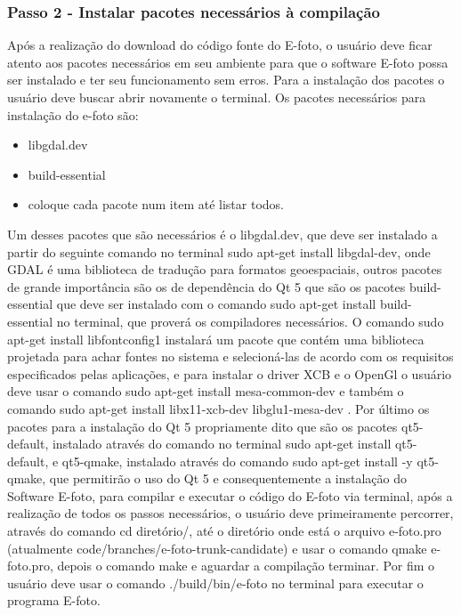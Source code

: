   \subsubsection{Passo 2 - Instalar pacotes necessários à compilação}  %
    Após a realização do download do código fonte do E-foto, o usuário deve ficar atento aos pacotes necessários em seu ambiente para que o software E-foto possa ser instalado e ter seu funcionamento sem erros. Para a instalação dos pacotes o usuário deve buscar abrir novamente o terminal. Os pacotes necessários para instalação do e-foto são:
    \begin{itemize}
    	\item libgdal.dev
    	\item build-essential
    	\item coloque cada pacote num item  até listar todos.
    \end{itemize}
    Um desses pacotes que são necessários é o libgdal.dev, que deve ser instalado a partir do seguinte comando no terminal %
     sudo apt-get install libgdal-dev, onde GDAL é uma biblioteca de tradução para formatos geoespaciais, outros pacotes de grande importância são os de dependência do Qt 5 que são os pacotes build-essential que deve ser instalado com o comando sudo apt-get install build-essential no terminal, que proverá os compiladores necessários. O comando sudo apt-get install libfontconfig1 instalará um pacote que contém uma biblioteca projetada para achar fontes no sistema e selecioná-las de acordo com os requisitos especificados pelas aplicações, e para instalar o driver XCB e o OpenGl o usuário deve usar o comando sudo apt-get install mesa-common-dev e também o comando sudo apt-get install libx11-xcb-dev libglu1-mesa-dev . Por último os pacotes para a instalação do Qt 5 propriamente dito que são os pacotes qt5-default, instalado através do comando no terminal sudo apt-get install qt5-default, e qt5-qmake, instalado através do comando sudo apt-get install -y qt5-qmake, que permitirão o uso do Qt 5 e consequentemente a instalação do Software E-foto, para compilar e executar o código do E-foto via terminal, após a realização de todos os passos necessários, o usuário deve primeiramente percorrer, através do comando cd diretório/, até o diretório onde está o arquivo e-foto.pro (atualmente code/branches/e-foto-trunk-candidate) e usar o comando qmake e-foto.pro, depois o comando make e aguardar a compilação terminar. Por fim o usuário deve usar o comando ./build/bin/e-foto no terminal para executar o programa E-foto.

